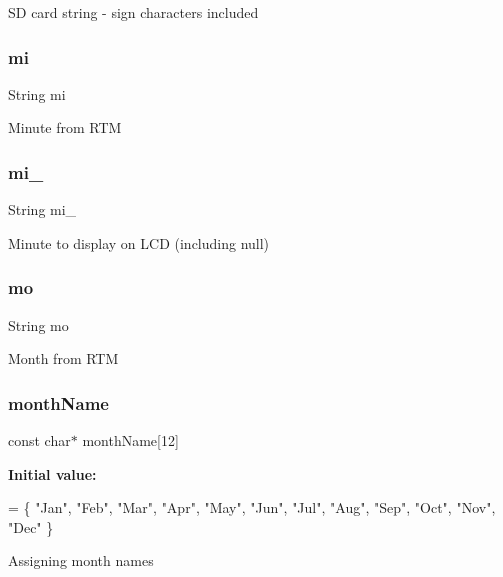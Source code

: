 SD card string -\/ sign characters included \mbox{\label{_w_s_8ino_a27f338e2e1e0c6b4e800a9a05aeeb00f}} 
\subsubsection{\texorpdfstring{mi}{mi}}
{\footnotesize\ttfamily String mi}

Minute from R\+TM \mbox{\label{_w_s_8ino_a941e7622afb12acf931c6da1910cc461}} 
\subsubsection{\texorpdfstring{mi\+\_}{mi\_0}}
{\footnotesize\ttfamily String mi\+\_}

Minute to display on L\+CD (including null) \mbox{\label{_w_s_8ino_ae87a77f51d231ab5614fdc0cc9734ae9}} 
\subsubsection{\texorpdfstring{mo}{mo}}
{\footnotesize\ttfamily String mo}

Month from R\+TM \mbox{\label{_w_s_8ino_a9fce7af8b9842b4ab3b85327b1af13fc}} 
\subsubsection{\texorpdfstring{month\+Name}{monthName}}
{\footnotesize\ttfamily const char$\ast$ month\+Name\mbox{[}12\mbox{]}}

{\bfseries Initial value\+:}
\begin{DoxyCode}
= \{
  \textcolor{stringliteral}{"Jan"}, \textcolor{stringliteral}{"Feb"}, \textcolor{stringliteral}{"Mar"}, \textcolor{stringliteral}{"Apr"}, \textcolor{stringliteral}{"May"}, \textcolor{stringliteral}{"Jun"},
  \textcolor{stringliteral}{"Jul"}, \textcolor{stringliteral}{"Aug"}, \textcolor{stringliteral}{"Sep"}, \textcolor{stringliteral}{"Oct"}, \textcolor{stringliteral}{"Nov"}, \textcolor{stringliteral}{"Dec"}
\}
\end{DoxyCode}
Assigning month names \mbox{\label{_w_s_8ino_a8455abbfc4590d0bf845dcd30505e1ce}} 
